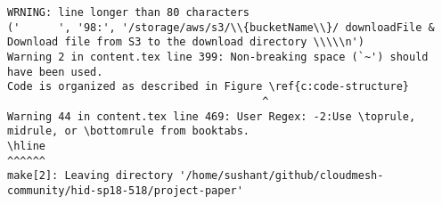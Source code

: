 \begin{tiny}
\begin{verbatim}
WRNING: line longer than 80 characters
('      ', '98:', '/storage/aws/s3/\\{bucketName\\}/ downloadFile & Download file from S3 to the download directory \\\\\n')
Warning 2 in content.tex line 399: Non-breaking space (`~') should have been used.
Code is organized as described in Figure \ref{c:code-structure}  
                                        ^
Warning 44 in content.tex line 469: User Regex: -2:Use \toprule, midrule, or \bottomrule from booktabs.
\hline  
^^^^^^
make[2]: Leaving directory '/home/sushant/github/cloudmesh-community/hid-sp18-518/project-paper'
\end{verbatim}
\end{tiny}

